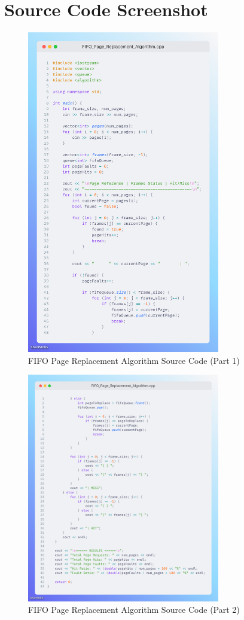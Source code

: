 \documentclass[12pt,a4paper]{article}
\begin{document}
\section{Source Code Screenshot}
\begin{figure}[H]
  \centering
  \includegraphics[width=0.75\textwidth]{Code1.png}
  \caption{FIFO Page Replacement Algorithm Source Code (Part 1)}
\end{figure}

\begin{figure}[H]
  \centering
  \includegraphics[width=0.75\textwidth]{Code2.png}
  \caption{FIFO Page Replacement Algorithm Source Code (Part 2)}
\end{figure}
\end{document}
